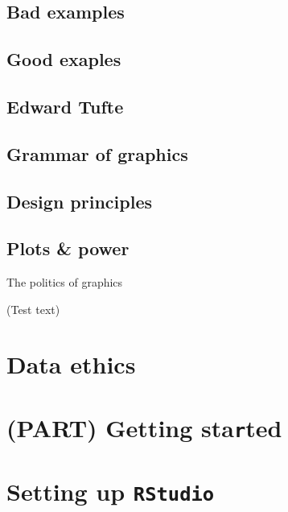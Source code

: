 \documentclass[
]{book}
\begin{document}
\hypertarget{bad-examples}{%
\section{Bad examples}\label{bad-examples}}

\hypertarget{good-exaples}{%
\section{Good exaples}\label{good-exaples}}

\hypertarget{edward-tufte}{%
\section{Edward Tufte}\label{edward-tufte}}

\hypertarget{grammar-of-graphics}{%
\section{Grammar of graphics}\label{grammar-of-graphics}}

\hypertarget{design-principles}{%
\section{Design principles}\label{design-principles}}

\hypertarget{plots-power}{%
\section{Plots \& power}\label{plots-power}}

The politics of graphics

(Test text)

\hypertarget{data-ethics}{%
\chapter{Data ethics}\label{data-ethics}}

\hypertarget{part-getting-started}{%
\chapter*{\texorpdfstring{(PART) Getting sta\texttt{r}ted}{(PART) Getting started}}\label{part-getting-started}}

\hypertarget{setting-up-rstudio}{%
\chapter{\texorpdfstring{Setting up \texttt{RStudio}}{Setting up RStudio}}\label{setting-up-rstudio}}
\end{document}
